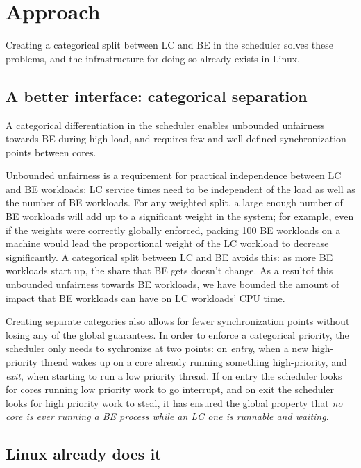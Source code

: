\section{Approach}\label{s:approach}


Creating a categorical split between LC and BE in the scheduler solves these
problems, and the infrastructure for doing so already exists in Linux.

\subsection{A better interface: categorical separation}\label{ss:interface}

A categorical differentiation in the scheduler enables unbounded unfairness
towards BE during high load, and requires few and well-defined synchronization
points between cores.

Unbounded unfairness is a requirement for practical independence between LC and
BE workloads: LC service times need to be independent of the load as well as the
number of BE workloads. For any weighted split, a large enough number of BE
workloads will add up to a significant weight in the system; for example, even
if the weights were correctly globally enforced, packing 100 BE workloads on a
machine would lead the proportional weight of the LC workload to decrease
significantly. A categorical split between LC and BE avoids this: as more BE
workloads start up, the share that BE gets doesn't change. As a resultof this
unbounded unfairness towards BE workloads, we have bounded the amount of impact
that BE workloads can have on LC workloads' CPU time.

Creating separate categories also allows for fewer synchronization points
without losing any of the global guarantees. In order to enforce a categorical
priority, the scheduler only needs to sychronize at two points: on
\textit{entry}, when a new high-priority thread wakes up on a core already
running something high-priority, and \textit{exit}, when starting to run a low
priority thread. If on entry the scheduler looks for cores running low priority
work to go interrupt, and on exit the scheduler looks for high priority work to
steal, it has ensured the global property that \textit{no core is ever running a
BE process while an LC one is runnable and waiting}.


\subsection{Linux already does it}


